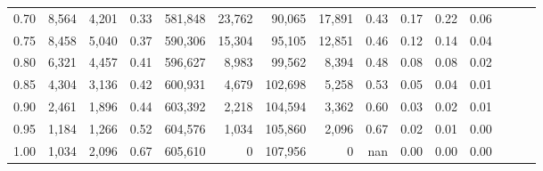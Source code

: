 \begin{tabular}{rrrrrrrrrrrrrrr}
0.70 &    8,564 &   4,201 &  0.33 &  581,848 &   23,762 &   90,065 &   17,891 &  0.43 &  0.17 &  0.22 &      0.06 \\
0.75 &    8,458 &   5,040 &  0.37 &  590,306 &   15,304 &   95,105 &   12,851 &  0.46 &  0.12 &  0.14 &      0.04 \\
0.80 &    6,321 &   4,457 &  0.41 &  596,627 &    8,983 &   99,562 &    8,394 &  0.48 &  0.08 &  0.08 &      0.02 \\
0.85 &    4,304 &   3,136 &  0.42 &  600,931 &    4,679 &  102,698 &    5,258 &  0.53 &  0.05 &  0.04 &      0.01 \\
0.90 &    2,461 &   1,896 &  0.44 &  603,392 &    2,218 &  104,594 &    3,362 &  0.60 &  0.03 &  0.02 &      0.01 \\
0.95 &    1,184 &   1,266 &  0.52 &  604,576 &    1,034 &  105,860 &    2,096 &  0.67 &  0.02 &  0.01 &      0.00 \\
1.00 &    1,034 &   2,096 &  0.67 &  605,610 &        0 &  107,956 &        0 &   nan &  0.00 &  0.00 &      0.00 \\
\bottomrule
\end{tabular}

